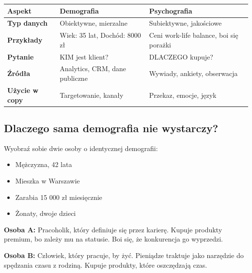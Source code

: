 \documentclass[
  12pt,
  a4paper,
  twoside,
  openright,
  12pt,
  DIV=12,
  BCOR=12mm]{scrbook}
\providecommand{\tightlist}{%
  \setlength{\itemsep}{0pt}\setlength{\parskip}{0pt}}\usepackage{longtable,booktabs,array}
\begin{document}
\begin{longtable}[]{@{}
  >{\raggedright\arraybackslash}p{}
  >{\raggedright\arraybackslash}p{}
  >{\raggedright\arraybackslash}p{}@{}}
\toprule\noalign{}
\begin{minipage}[b]{\linewidth}\raggedright
Aspekt
\end{minipage} & \begin{minipage}[b]{\linewidth}\raggedright
Demografia
\end{minipage} & \begin{minipage}[b]{\linewidth}\raggedright
Psychografia
\end{minipage} \\
\midrule\noalign{}
\endhead
\bottomrule\noalign{}
\endlastfoot
\textbf{Typ danych} & Obiektywne, mierzalne & Subiektywne, jakościowe \\
\textbf{Przykłady} & Wiek: 35 lat, Dochód: 8000 zł & Ceni work-life
balance, boi się porażki \\
\textbf{Pytanie} & KIM jest klient? & DLACZEGO kupuje? \\
\textbf{Źródła} & Analytics, CRM, dane publiczne & Wywiady, ankiety,
obserwacja \\
\textbf{Użycie w copy} & Targetowanie, kanały & Przekaz, emocje,
język \\
\end{longtable}

\subsection{Dlaczego sama demografia nie
wystarczy?}\label{dlaczego-sama-demografia-nie-wystarczy}

Wyobraź sobie dwie osoby o identycznej demografii:

\begin{itemize}
\tightlist
\item
  Mężczyzna, 42 lata
\item
  Mieszka w Warszawie
\item
  Zarabia 15 000 zł miesięcznie
\item
  Żonaty, dwoje dzieci
\end{itemize}

\textbf{Osoba A:} Pracoholik, który definiuje się przez karierę. Kupuje
produkty premium, bo zależy mu na statusie. Boi się, że konkurencja go
wyprzedzi.

\textbf{Osoba B:} Człowiek, który pracuje, by żyć. Pieniądze traktuje
jako narzędzie do spędzania czasu z rodziną. Kupuje produkty, które
oszczędzają czas.
\end{document}
